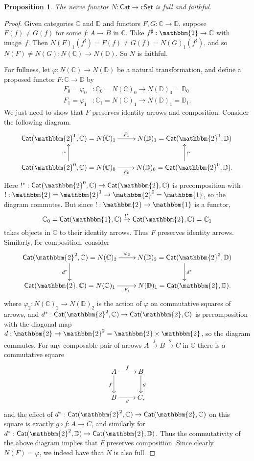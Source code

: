 \documentclass[12pt]{article}
\newcommand{\bbtwo}{\ensuremath{\mathbbm{2}}}
\newcommand{\D}{\ensuremath{\mathbb{D}}}
\newcommand{\bbC}{\ensuremath{\mathbb{C}}}
\newcommand{\Cat}{\ensuremath{\mathsf{Cat}}}
\newcommand{\cSet}{\ensuremath{\mathsf{cSet}}}
\renewcommand{\to}{\ensuremath{\rightarrow}}
\newtheorem{proposition}[theorem]{Proposition}
\theoremstyle{remark}
\theoremstyle{definition}
\begin{document}
\begin{proposition}
The nerve functor $N : \Cat \to \cSet$ is full and faithful.
\end{proposition}
\begin{proof}
Given categories $\bbC$ and $\D$ and functors $F, G : \bbC\to\D$, suppose $F(f) \neq G(f)$ for some $f : A\to B$ in $\bbC$.  Take $f^{\sharp} : \bbtwo \to \bbC$ with image~$f$.  Then $N(F)_1(f^\sharp) = F(f) \neq G(f) = N(G)_1(f^\sharp)$, and so $N(F) \neq N(G) : N(\bbC)\to N(\D)$.  So $N$ is faithful.

For fullness, let $\varphi : N(\bbC) \to N(\D)$ be a natural transformation, and define a proposed functor $F : \bbC\to \D$ by  
\begin{align*}
F_0 = \varphi_0 &: \bbC_0 = N(\bbC)_0 \to N(\D)_0 = \D_0\\
F_1 = \varphi_1 &: \bbC_1 = N(\bbC)_1 \to N(\D)_1 = \D_1.
 \end{align*}
We just need to show that $F$ preserves identity arrows and composition.
Consider the following diagram.
\[
\xymatrix{
\Cat(\bbtwo^1, \bbC) = N(\bbC)_1 \ar[r]^{F_1} & N(\D)_1 = \Cat(\bbtwo^1, \D) \\
\Cat(\bbtwo^0, \bbC) = N(\bbC)_0 \ar[u]^{!^*} \ar[r]_{F_0} & N(\D)_0 = \Cat(\bbtwo^0, \D) \ar[u]_{!^*}.
}
\]
Here $!^* : \Cat(\bbtwo^0, \bbC) \to \Cat(\bbtwo, \bbC) $ is precomposition with $! : \bbtwo = \bbtwo^1 \rightarrow \bbtwo^0 = \mathbbm{1}$, so the diagram commutes.  But since $! : \bbtwo \rightarrow \mathbbm{1}$ is a functor, $$\bbC_0 = \Cat(\mathbbm{1}, \bbC)  \stackrel{!^*}{\to}  \Cat(\bbtwo, \bbC) = \bbC_1$$ takes objects in $\bbC$ to their identity arrows.  Thus $F$ preserves identity arrows.  Similarly, for composition, consider 
\[
\xymatrix{
\Cat(\bbtwo^2, \bbC) = N(\bbC)_2 \ar[d]_{d^*} \ar[r]^{\varphi_2} & N(\D)_2 = \Cat(\bbtwo^2, \D) \ar[d]^{d^*} \\
\Cat(\bbtwo, \bbC) = N(\bbC)_1  \ar[r]_{F_1} & N(\D)_1 = \Cat(\bbtwo, \D).
}
\]
where $\varphi_2 : N(\bbC)_2 \to N(\D)_2$ is the action of $\varphi$ on commutative squares of arrows, and $d^* : \Cat(\bbtwo^2, \bbC) \to \Cat(\bbtwo, \bbC)$ is precomposition with the diagonal map $d : \bbtwo \rightarrow \bbtwo^2 = \bbtwo\times\bbtwo$, so the diagram commutes.  For any composable pair of arrows $A \stackrel{f}{\to} B \stackrel{g}{\to} C$ in $\bbC$ there is a commutative square 
\[
\xymatrix{
A \ar[r]^{f} \ar[d]_{f} & B \ar[d]^{g} \\
B  \ar[r]_{g} & C,
}
\]
and the effect of $d^* : \Cat(\bbtwo^2, \bbC) \to \Cat(\bbtwo, \bbC)$ on this square is exactly $g\circ f: A\to C$, and similarly for $d^* : \Cat(\bbtwo^2, \D) \to \Cat(\bbtwo, \D)$.  Thus the commutativity of the above diagram implies that $F$ preserves composition.
Since clearly $N(F) = \varphi$, we indeed have that $N$ is also full.
\end{proof}
\end{document}
